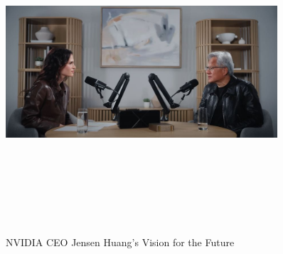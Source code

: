 \documentclass[a4paper,12pt]{article}
\begin{document}
\vspace{50pt} %
\begin{figure}[h]
	\centering
	\vspace{-10pt} %
	\includegraphics[width=0.9\textwidth, height=12cm, keepaspectratio]{../Talks Blogs/NVIDIA CEO Jensen Huang's Vision for the Future}
	\vspace{-5pt} %
	\caption{NVIDIA CEO Jensen Huang's Vision for the Future}
	\vspace{-10pt}
\end{figure}
\end{document}
